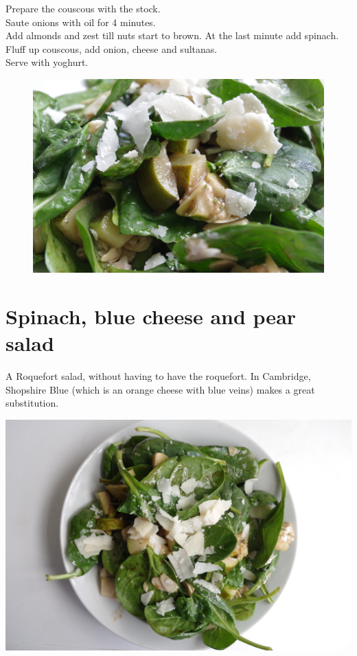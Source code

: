 \documentclass{tufte-book}
\begin{document}
\smallskip
Prepare the couscous with the stock.
\\Saute onions with oil for 4 minutes.
\\Add almonds and zest till nuts start to brown. At the last minute add spinach.
\\Fluff up couscous, add onion, cheese and sultanas.
\\Serve with yoghurt.


\begin{figure}[h]
  \includegraphics[width=\linewidth]{pearsalad.JPG}
\end{figure}

\section{Spinach, blue cheese and pear salad}

A Roquefort salad, without having to have the roquefort. In Cambridge, Shopshire Blue (which is an orange cheese with blue veins) makes a great substitution.

\begin{marginfigure}%
  \includegraphics[width=\linewidth]{pearsaladabove.JPG}
\end{marginfigure}
\end{document}
